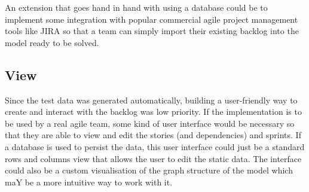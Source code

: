 An extension that goes hand in hand with using a database could be to implement some integration with popular commercial agile project management tools like JIRA so that a team can simply import their existing backlog into the model ready to be solved.

\subsection{View}
Since the test data was generated automatically, building a user-friendly way to create and interact with the backlog was low priority. If the implementation is to be used by a real agile team, some kind of user interface would be necessary so that they are able to view and edit the stories (and dependencies) and sprints. If a database is used to persist the data, this user interface could just be a standard rows and columns view that allows the user to edit the static data. The interface could also be a custom visualisation of the graph structure of the model which maY be a more intuitive way to work with it.